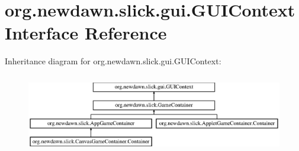 \hypertarget{interfaceorg_1_1newdawn_1_1slick_1_1gui_1_1_g_u_i_context}{}\section{org.\+newdawn.\+slick.\+gui.\+G\+U\+I\+Context Interface Reference}
\label{interfaceorg_1_1newdawn_1_1slick_1_1gui_1_1_g_u_i_context}
Inheritance diagram for org.\+newdawn.\+slick.\+gui.\+G\+U\+I\+Context\+:\begin{figure}[H]
\begin{center}
\leavevmode
\includegraphics[height=3.522013cm]{interfaceorg_1_1newdawn_1_1slick_1_1gui_1_1_g_u_i_context}
\end{center}
\end{figure}
